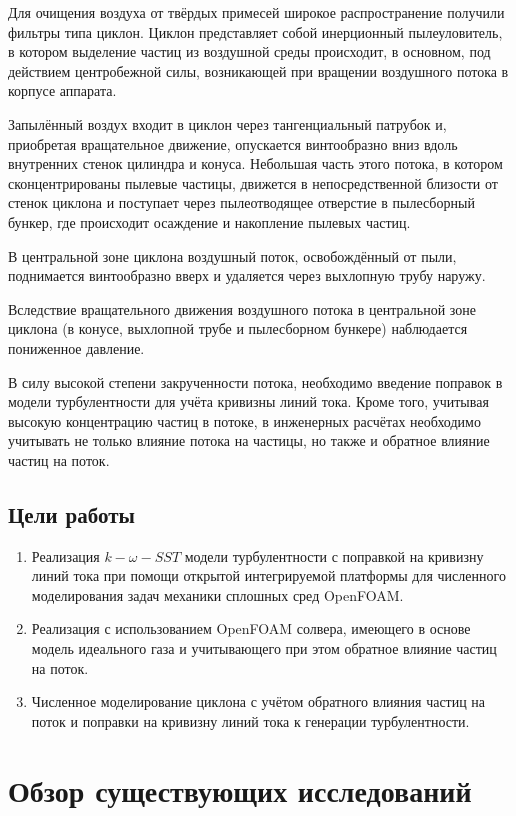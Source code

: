 \documentclass[pdftex,a4paper,12pt]{article}
\begin{document}
		Для очищения воздуха от твёрдых примесей широкое распространение получили фильтры типа циклон. Циклон представляет собой инерционный пылеуловитель, в котором выделение частиц из воздушной среды происходит, в основном, под действием центробежной силы, возникающей при вращении воздушного потока в корпусе аппарата.
	
		Запылённый воздух входит в циклон через тангенциальный патрубок и, приобретая вращательное движение, опускается винтообразно вниз вдоль внутренних стенок цилиндра и конуса. Небольшая часть этого потока, в котором сконцентрированы пылевые частицы, движется в непосредственной близости от стенок циклона и поступает через пылеотводящее отверстие в пылесборный бункер, где происходит осаждение и накопление пылевых частиц.
	
		В центральной зоне циклона воздушный поток, освобождённый от пыли, поднимается винтообразно вверх и удаляется через выхлопную трубу наружу.
	
		Вследствие вращательного движения воздушного потока в центральной зоне циклона (в конусе, выхлопной трубе и пылесборном бункере) наблюдается пониженное давление.\cite{instructions}
	
		В силу высокой степени закрученности потока, необходимо введение поправок в модели турбулентности для учёта кривизны линий тока. Кроме того, учитывая высокую концентрацию частиц в потоке, в инженерных расчётах необходимо учитывать не только влияние потока на частицы, но также и обратное влияние частиц на поток.
	\subsection{Цели работы}
		\begin{enumerate}
			\item Реализация $k-\omega-SST$ модели турбулентности с поправкой на кривизну линий тока при помощи открытой интегрируемой платформы для численного моделирования задач механики сплошных сред OpenFOAM.
			\item Реализация с использованием OpenFOAM солвера, имеющего в основе модель идеального газа и учитывающего при этом обратное влияние частиц на поток.
			\item Численное моделирование циклона с учётом обратного влияния частиц на поток и поправки на кривизну линий тока к генерации турбулентности.
		\end{enumerate}
\newpage

\section{Обзор существующих исследований}
\end{document}

